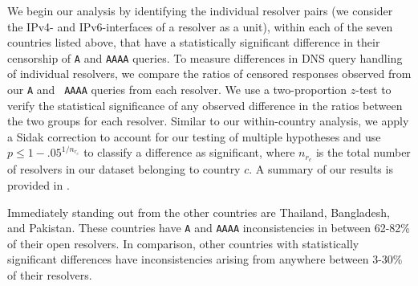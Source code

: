 %
We begin our analysis by identifying the individual resolver pairs (\ie we
consider the IPv4- and IPv6-interfaces of a resolver as a unit), within each
of the seven countries listed above, that have a statistically significant
difference in their censorship of {\tt A} and {\tt AAAA} queries.
%
To measure differences in DNS query handling of individual resolvers, we
compare the ratios of censored responses observed from our {\tt A} and {\tt
AAAA} queries {from each resolver}.  
%
We use a two-proportion $z$-test to verify the statistical significance of any
observed difference in the ratios between the two groups for each resolver.
Similar to our within-country analysis, we apply a Sidak correction to account
for our testing of multiple hypotheses and use $p \leq 1-{.05}^{1/n_{r_c}}$ to
classify a difference as significant, where $n_{r_c}$ is the total number of
resolvers in our dataset belonging to country $c$.
%
A summary of our results is provided in . 

%
Immediately standing out from the other countries are Thailand, Bangladesh, and
Pakistan. These countries have {\tt A} and {\tt AAAA} inconsistencies in
between 62-82\% of their open resolvers. In comparison, other countries with
statistically significant differences have inconsistencies arising from
anywhere between 3-30\% of their resolvers. 
%

